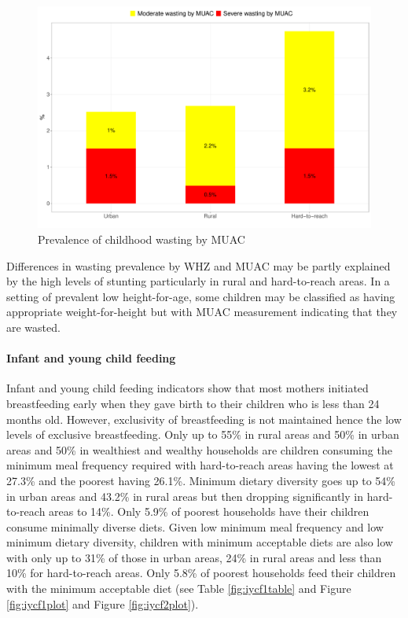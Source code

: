 \documentclass[12pt,a4paper]{article}
\let\oldparagraph\paragraph
\renewcommand{\paragraph}[1]{\oldparagraph{#1}\mbox{}}
\begin{document}
\begin{figure}[H]

{\centering \includegraphics{kayahReport_files/figure-latex/muacPlot-1} 

}

\caption{Prevalence of childhood wasting by MUAC}\label{fig:muacPlot}
\end{figure}

Differences in wasting prevalence by WHZ and MUAC may be partly explained by the high levels of stunting particularly in rural and hard-to-reach areas. In a setting of prevalent low height-for-age, some children may be classified as having appropriate weight-for-height but with MUAC measurement indicating that they are wasted.

\hypertarget{iycf-results}{%
\paragraph{Infant and young child feeding}\label{iycf-results}}

Infant and young child feeding indicators show that most mothers initiated breastfeeding early when they gave birth to their children who is less than 24 months old. However, exclusivity of breastfeeding is not maintained hence the low levels of exclusive breastfeeding. Only up to 55\% in rural areas and 50\% in urban areas and 50\% in wealthiest and wealthy households are children consuming the minimum meal frequency required with hard-to-reach areas having the lowest at 27.3\% and the poorest having 26.1\%. Minimum dietary diversity goes up to 54\% in urban areas and 43.2\% in rural areas but then dropping significantly in hard-to-reach areas to 14\%. Only 5.9\% of poorest households have their children consume minimally diverse diets. Given low minimum meal frequency and low minimum dietary diversity, children with minimum acceptable diets are also low with only up to 31\% of those in urban areas, 24\% in rural areas and less than 10\% for hard-to-reach areas. Only 5.8\% of poorest households feed their children with the minimum acceptable diet (see Table \ref{fig:iycf1table} and Figure \ref{fig:iycf1plot} and Figure \ref{fig:iycf2plot}).
\end{document}
